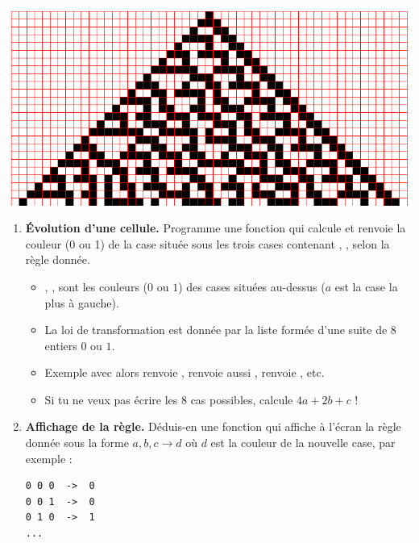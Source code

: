 \documentclass[11pt,class=report,crop=false]{standalone}
\begin{document}
\begin{activite}


\begin{center}
\includegraphics[scale=\myscale,scale=0.4]{ecran-automate-6}
\end{center}	

\begin{enumerate}
  \item \textbf{Évolution d'une cellule.} Programme une fonction 
  qui calcule et renvoie la couleur (0 ou 1) de la case
  située sous les trois cases contenant , ,  selon la règle
  donnée.
  
  
  \begin{itemize}
    \item {}, ,  sont les couleurs ($0$ ou $1$) des cases situées au-dessus ($a$ est la case la plus à gauche).
    \item La loi de transformation est donnée par la liste  formée d'une suite de $8$ entiers $0$ ou $1$. 
    
    \item Exemple avec  alors  renvoie , 
     renvoie aussi ,   renvoie , etc.
    
  \item Si tu ne veux pas écrire les $8$ cas possibles, calcule $4a+2b+c$ ! 
  \end{itemize}
  
  \item \textbf{Affichage de la règle.} Déduis-en une fonction  qui affiche à l'écran la règle donnée sous la forme \og{}$a,b,c \rightarrow d$\fg{} où $d$ est la couleur de la nouvelle case, par exemple :
\begin{lstlisting}
0 0 0  ->  0
0 0 1  ->  0
0 1 0  ->  1
...
\end{lstlisting}


\end{enumerate}
\end{activite}
\end{document}
